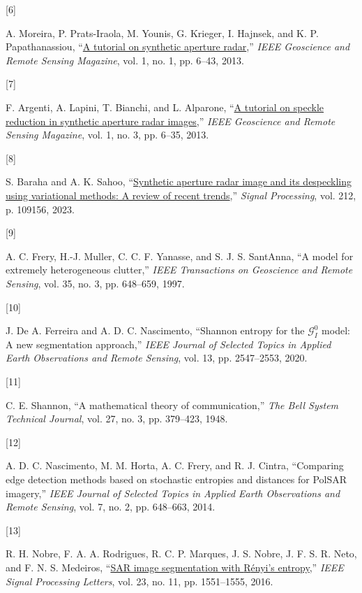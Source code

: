 \documentclass[
  lettersize  journal,
]{IEEEtran}%
\newlength{\cslhangindent}
\newlength{\csllabelwidth}
\newenvironment{CSLReferences}[2] %
 {\begin{list}{}{%
  \setlength{\itemindent}{0pt}
  \setlength{\leftmargin}{0pt}
  \setlength{\parsep}{0pt}
  \ifodd #1
   \setlength{\leftmargin}{\cslhangindent}
   \setlength{\itemindent}{-1\cslhangindent}
  \fi
  \setlength{\itemsep}{#2\baselineskip}}}
 {\end{list}}
\newcommand{\CSLLeftMargin}[1]{\parbox[t]{\csllabelwidth}{\strut#1\strut}}
\newcommand{\CSLRightInline}[1]{\parbox[t]{\linewidth - \csllabelwidth}{\strut#1\strut}}
\begin{document}
\begin{CSLReferences}{0}{0}
\CSLLeftMargin{{[}6{]} }%
\CSLRightInline{A. Moreira, P. Prats-Iraola, M. Younis, G. Krieger, I.
Hajnsek, and K. P. Papathanassiou,
{``\href{https://doi.org/10.1109/mgrs.2013.2248301}{A tutorial on
synthetic aperture radar},''} \emph{IEEE Geoscience and Remote Sensing
Magazine}, vol. 1, no. 1, pp. 6--43, 2013. }

\CSLLeftMargin{{[}7{]} }%
\CSLRightInline{F. Argenti, A. Lapini, T. Bianchi, and L. Alparone,
{``\href{https://doi.org/10.1109/mgrs.2013.2277512}{A tutorial on
speckle reduction in synthetic aperture radar images},''} \emph{IEEE
Geoscience and Remote Sensing Magazine}, vol. 1, no. 3, pp. 6--35, 2013.
}

\CSLLeftMargin{{[}8{]} }%
\CSLRightInline{S. Baraha and A. K. Sahoo,
{``\href{https://doi.org/10.1016/j.sigpro.2023.109156}{Synthetic
aperture radar image and its despeckling using variational methods: A
review of recent trends},''} \emph{Signal Processing}, vol. 212, p.
109156, 2023. }

\CSLLeftMargin{{[}9{]} }%
\CSLRightInline{A. C. Frery, H.-J. Muller, C. C. F. Yanasse, and S. J.
S. SantAnna, {``A model for extremely heterogeneous clutter,''}
\emph{{IEEE} Transactions on Geoscience and Remote Sensing}, vol. 35,
no. 3, pp. 648--659, 1997. }

\CSLLeftMargin{{[}10{]} }%
\CSLRightInline{J. De A. Ferreira and A. D. C. Nascimento, {``Shannon
entropy for the {\(\mathcal {G}^0_{I}\)} model: A new segmentation
approach,''} \emph{{IEEE} Journal of Selected Topics in Applied Earth
Observations and Remote Sensing}, vol. 13, pp. 2547--2553, 2020. }

\CSLLeftMargin{{[}11{]} }%
\CSLRightInline{C. E. Shannon, {``A mathematical theory of
communication,''} \emph{The Bell System Technical Journal}, vol. 27, no.
3, pp. 379--423, 1948. }

\CSLLeftMargin{{[}12{]} }%
\CSLRightInline{A. D. C. Nascimento, M. M. Horta, A. C. Frery, and R. J.
Cintra, {``Comparing edge detection methods based on stochastic
entropies and distances for {PolSAR} imagery,''} \emph{{IEEE} Journal of
Selected Topics in Applied Earth Observations and Remote Sensing}, vol.
7, no. 2, pp. 648--663, 2014. }

\CSLLeftMargin{{[}13{]} }%
\CSLRightInline{R. H. Nobre, F. A. A. Rodrigues, R. C. P. Marques, J. S.
Nobre, J. F. S. R. Neto, and F. N. S. Medeiros,
{``\href{https://doi.org/10.1109/lsp.2016.2606760}{SAR image
segmentation with {R}ényi's entropy},''} \emph{IEEE Signal Processing
Letters}, vol. 23, no. 11, pp. 1551--1555, 2016. }


\end{CSLReferences}
\end{document}
